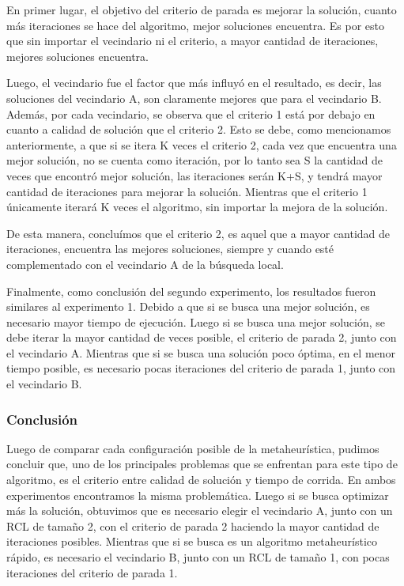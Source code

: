 En primer lugar, el objetivo del criterio de parada es mejorar la solución, cuanto más iteraciones se hace del algoritmo, mejor soluciones encuentra. Es por esto que sin importar el vecindario ni el criterio, a mayor cantidad de iteraciones, mejores soluciones encuentra. 
\par Luego, el vecindario fue el factor que más influyó en el resultado, es decir, las soluciones del vecindario A, son claramente mejores que para el vecindario B. Además, por cada vecindario, se observa que el criterio 1 está por debajo en cuanto a calidad de solución que el criterio 2. Esto se debe, como mencionamos anteriormente, a que si se itera K veces el criterio 2, cada vez que encuentra una mejor solución, no se cuenta como iteración, por lo tanto sea S la cantidad de veces que encontró mejor solución, las iteraciones serán K+S, y tendrá mayor cantidad de iteraciones para mejorar la solución. Mientras que el criterio 1 únicamente iterará K veces el algoritmo, sin importar la mejora de la solución.
\par De esta manera, concluímos que el criterio 2, es aquel que a mayor cantidad de iteraciones, encuentra las mejores soluciones, siempre y cuando esté complementado con el vecindario A de la búsqueda local.

\par Finalmente, como conclusión del segundo experimento, los resultados fueron similares al experimento 1. Debido a que si se busca una mejor solución, es necesario mayor tiempo de ejecución. Luego si se busca una mejor solución, se debe iterar la mayor cantidad de veces posible, el criterio de parada 2, junto con el vecindario A. Mientras que si se busca una solución poco óptima, en el menor tiempo posible, es necesario pocas iteraciones del criterio de parada 1, junto con el vecindario B. 


\subsubsection{Conclusión}

Luego de comparar cada configuración posible de la metaheurística, pudimos concluir que, uno de los principales problemas que se enfrentan para este tipo de algoritmo, es el criterio entre calidad de solución y tiempo de corrida. En ambos experimentos encontramos la misma problemática. Luego si se busca optimizar más la solución, obtuvimos que es necesario elegir el vecindario A, junto con un RCL de tamaño 2, con el criterio de parada 2 haciendo la mayor cantidad de iteraciones posibles. Mientras que si se busca es un algoritmo metaheurístico rápido, es necesario el vecindario B, junto con un RCL de tamaño 1, con pocas iteraciones del criterio de parada 1. 